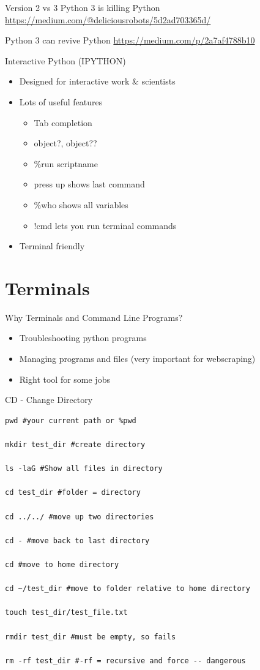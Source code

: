 \documentclass[presentation]{beamer}
\begin{document}
\begin{frame}[label=sec-2-0-7]{Version 2 vs 3}
Python 3 is killing Python
\url{https://medium.com/@deliciousrobots/5d2ad703365d/} 

Python 3 can revive Python
\url{https://medium.com/p/2a7af4788b10}
\end{frame}

\begin{frame}[label=sec-2-0-8]{Interactive Python (IPYTHON)}
\begin{itemize}
\item Designed for interactive work \& scientists
\item Lots of useful features
\begin{itemize}
\item Tab completion
\item object?, object??
\item \%run scriptname
\item press up shows last command
\item \%who shows all variables
\item !cmd lets you run terminal commands
\end{itemize}
\item Terminal friendly
\end{itemize}
\end{frame}
\section{Terminals}
\label{sec-3}

\begin{frame}[label=sec-3-0-1]{Why Terminals and Command Line Programs?}
\begin{itemize}
\item Troubleshooting python programs
\item Managing programs and files (very important for webscraping)
\item Right tool for some jobs
\end{itemize}
\end{frame}

\begin{frame}[fragile,label=sec-3-0-2]{CD - Change Directory}
 \lstset{numbers=left,language=sh,label= ,caption= }
\begin{lstlisting}
pwd #your current path or %pwd 

mkdir test_dir #create directory

ls -laG #Show all files in directory

cd test_dir #folder = directory

cd ../../ #move up two directories

cd - #move back to last directory

cd #move to home directory

cd ~/test_dir #move to folder relative to home directory

touch test_dir/test_file.txt

rmdir test_dir #must be empty, so fails

rm -rf test_dir #-rf = recursive and force -- dangerous
\end{lstlisting}
\end{frame}
\end{document}
